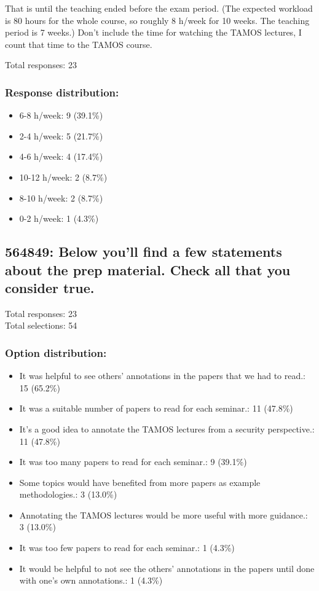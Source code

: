 \documentclass[a4paper]{report}
\begin{document}
That is until the teaching ended before the exam period. (The expected workload 
is 80 hours for the whole course, so roughly 8 h/week for 10 weeks. The 
teaching period is 7 weeks.)
Don't include the time for watching the TAMOS lectures, I count that time to 
the TAMOS course.

Total responses: 23\\

\subsubsection{Response distribution:}
\begin{itemize}
  \item 6-8 h/week: 9 (39.1\%)
  \item 2-4 h/week: 5 (21.7\%)
  \item 4-6 h/week: 4 (17.4\%)
  \item 10-12 h/week: 2 (8.7\%)
  \item 8-10 h/week: 2 (8.7\%)
  \item 0-2 h/week: 1 (4.3\%)
\end{itemize}

\subsection{564849: Below you'll find a few statements about the prep material. Check all that you consider true.}

Total responses: 23\\
Total selections: 54\\

\subsubsection{Option distribution:}
\begin{itemize}
  \item It was helpful to see others' annotations in the papers that we had to read.: 15 (65.2\%)
  \item It was a suitable number of papers to read for each seminar.: 11 (47.8\%)
  \item It's a good idea to annotate the TAMOS lectures from a security perspective.: 11 (47.8\%)
  \item It was too many papers to read for each seminar.: 9 (39.1\%)
  \item Some topics would have benefited from more papers as example methodologies.: 3 (13.0\%)
  \item Annotating the TAMOS lectures would be more useful with more guidance.: 3 (13.0\%)
  \item It was too few papers to read for each seminar.: 1 (4.3\%)
  \item It would be helpful to not see the others' annotations in the papers until done with one's own annotations.: 1 (4.3\%)
\end{itemize}
\end{document}
